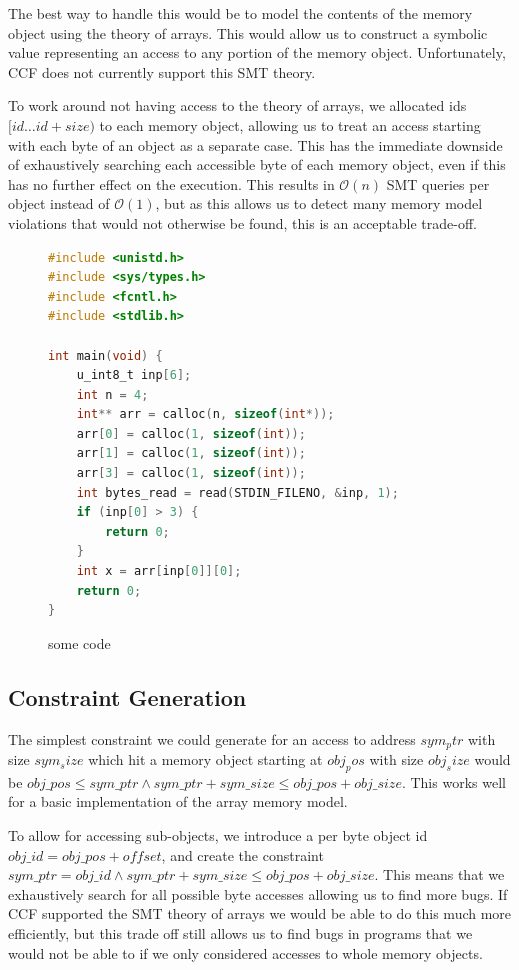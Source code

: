 \documentclass[12pt,twoside]{report}
\begin{document}
The best way to handle this would be to model the contents of the memory object using the theory of arrays. This would allow us to construct a symbolic value representing an access to any portion of the memory object. Unfortunately, CCF does not currently support this SMT theory.

To work around not having access to the theory of arrays, we allocated ids $[id \dots id + size)$ to each memory object, allowing us to treat an access starting with each byte of an object as a separate case. This has the immediate downside of exhaustively searching each accessible byte of each memory object, even if this has no further effect on the execution. This results in $\mathcal{O}(n)$ SMT queries per object instead of $\mathcal{O}(1)$, but as this allows us to detect many memory model violations that would not otherwise be found, this is an acceptable trade-off.

\begin{figure}
    \centering
    \begin{lstlisting}[language=C]
#include <unistd.h>
#include <sys/types.h>
#include <fcntl.h>
#include <stdlib.h>

int main(void) {
    u_int8_t inp[6];
    int n = 4;
    int** arr = calloc(n, sizeof(int*));
    arr[0] = calloc(1, sizeof(int));
    arr[1] = calloc(1, sizeof(int));
    arr[3] = calloc(1, sizeof(int));
    int bytes_read = read(STDIN_FILENO, &inp, 1);
    if (inp[0] > 3) {
        return 0;
    }
    int x = arr[inp[0]][0];
    return 0;
}
\end{lstlisting}
    \caption{some code}
    \label{DoubleIndirection}
\end{figure}

\subsection{Constraint Generation}
The simplest constraint we could generate for an access to address $sym_ptr$ with size $sym_size$ which hit a memory object starting at $obj_pos$ with size $obj_size$ would be $obj\_pos \leq sym\_ptr \wedge sym\_ptr + sym\_size\leq obj\_pos + obj\_size$. This works well for a basic implementation of the array memory model.

To allow for accessing sub-objects, we introduce a per byte object id $obj\_id = obj\_pos + offset$, and create the constraint $sym\_ptr = obj\_id \wedge sym\_ptr + sym\_size\leq obj\_pos + obj\_size$. This means that we exhaustively search for all possible byte accesses allowing us to find more bugs. If CCF supported the SMT theory of arrays we would be able to do this much more efficiently, but this trade off still allows us to find bugs in programs that we would not be able to if we only considered accesses to whole memory objects.
\end{document}

